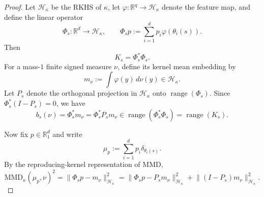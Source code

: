\documentclass{article}
\begin{document}
\begin{proof}
Let $\mathcal H_\kappa$ be the RKHS of $\kappa$, let $\varphi : \mathbb R^q \to \mathcal H_\kappa$ denote the feature map, and define the linear operator
\begin{equation}
\Phi_s : \mathbb R^d \to \mathcal H_\kappa, \qquad \Phi_s p := \sum_{i=1}^d p_i \varphi(\theta_i(s)).
\end{equation}
Then
\begin{equation}
K_s = \Phi_s^*\Phi_s .
\end{equation}
For a mass-$1$ finite signed measure $\nu$, define its kernel mean embedding by
\begin{equation}
m_\nu := \int \varphi(y)\,d\nu(y) \in \mathcal H_\kappa .
\end{equation}
Let $P_s$ denote the orthogonal projection in $\mathcal H_\kappa$ onto $\operatorname{range}(\Phi_s)$. Since $\Phi_s^*(I-P_s)=0$, we have
\begin{equation}
b_s(\nu) = \Phi_s^* m_\nu = \Phi_s^* P_s m_\nu \in \operatorname{range}(\Phi_s^*\Phi_s) = \operatorname{range}(K_s).
\end{equation}

Now fix $p \in \mathbb R_1^d$ and write
\begin{equation}
\mu_p := \sum_{i=1}^d p_i \delta_{\theta_i(s)} .
\end{equation}
By the reproducing-kernel representation of MMD,
\begin{equation}
\mathrm{MMD}_\kappa(\mu_p,\nu)^2 = \lVert \Phi_s p - m_\nu \rVert_{\mathcal H_\kappa}^2 = \lVert \Phi_s p - P_s m_\nu \rVert_{\mathcal H_\kappa}^2 + \lVert (I-P_s)m_\nu \rVert_{\mathcal H_\kappa}^2 .
\end{equation}


\end{proof}
\end{document}
